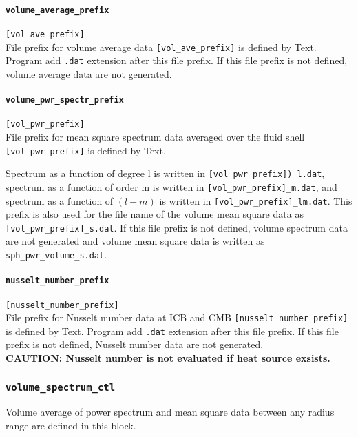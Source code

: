 \paragraph{\tt volume\_average\_prefix}
\label{href_t:volume_average_prefix}
\verb|[vol_ave_prefix]| \\
File prefix for volume average data \verb|[vol_ave_prefix]| is defined by Text. Program add {\tt .dat} extension after this file prefix. If this file prefix is not defined, volume average data are not generated. 

\paragraph{\tt volume\_pwr\_spectr\_prefix}
\label{href_t:volume_pwr_spectr_prefix}
\verb|[vol_pwr_prefix]| \\
File prefix for mean square spectrum data averaged over the fluid shell \verb|[vol_pwr_prefix]| is defined by Text. 

Spectrum as a function of degree {l} is written in \verb|[vol_pwr_prefix])_l.dat|, spectrum as a function of order {m} is written in \verb|[vol_pwr_prefix]_m.dat|, and spectrum as a function of $(l-m)$ is written in \verb|[vol_pwr_prefix]_lm.dat|. This prefix is also used for the file name of the volume mean square data as \verb|[vol_pwr_prefix]_s.dat|.
If this file prefix is not defined, volume spectrum data are not generated and volume mean square data is written as \verb|sph_pwr_volume_s.dat|.

\paragraph{\tt nusselt\_number\_prefix}
\label{href_t:nusselt_number_prefix}
\verb|[nusselt_number_prefix]| \\
File prefix for Nusselt number data at ICB and CMB \verb|[nusselt_number_prefix]| is defined by Text. Program add {\tt .dat} extension after this file prefix. If this file prefix is not defined, Nusselt number data are not generated. \\
{\bf CAUTION: Nusselt number is not evaluated if heat source exsists.}

%
\subsubsection{\tt volume\_spectrum\_ctl}
\label{href_t:volume_spectrum_ctl}
Volume average of power spectrum and mean square data between any radius range are defined in this block.

